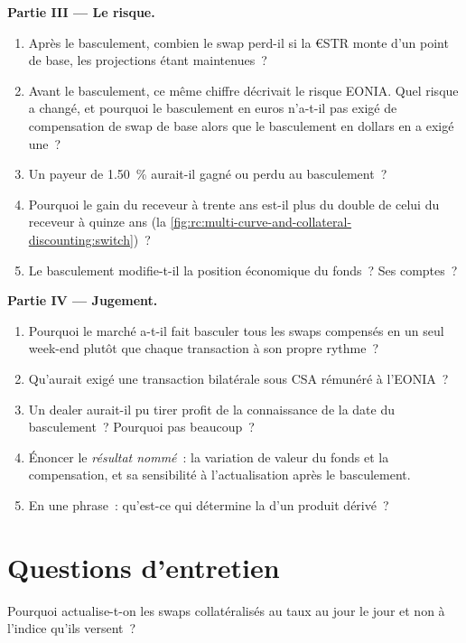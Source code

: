 \begin{problem}
\medskip\noindent\textbf{Partie III --- Le risque.}
\begin{enumerate}[resume]
\item Après le basculement, combien le swap perd-il si la  €STR
monte d'un point de base, les projections étant maintenues~?
\item Avant le basculement, ce même chiffre décrivait le risque EONIA. Quel risque a
changé, et pourquoi le basculement en euros n'a-t-il pas exigé de compensation de swap de base alors que le
basculement en dollars en a exigé une~?
\item Un payeur de 1.50~\% aurait-il gagné ou perdu au basculement~?
\item Pourquoi le gain du receveur à trente ans est-il plus du double de celui du receveur à quinze ans
(la \cref{fig:rc:multi-curve-and-collateral-discounting:switch})~?
\item Le basculement modifie-t-il la position économique du fonds~? Ses comptes~?
\end{enumerate}

\medskip\noindent\textbf{Partie IV --- Jugement.}
\begin{enumerate}[resume]
\item Pourquoi le marché a-t-il fait basculer tous les swaps compensés en un seul week-end plutôt que
chaque transaction à son propre rythme~?
\item Qu'aurait exigé une transaction bilatérale sous CSA rémunéré à l'EONIA~?
\item Un dealer aurait-il pu tirer profit de la connaissance de la date du basculement~? Pourquoi pas beaucoup~?
\item Énoncer le \emph{résultat nommé}~: la variation de valeur du fonds et la compensation,
et sa sensibilité à l'actualisation après le basculement.
\item En une phrase~: qu'est-ce qui détermine la  d'un produit dérivé~?
\end{enumerate}
\end{problem}

\section{Questions d'entretien}

\begin{interviewq}\label{iq:rc:multi-curve-and-collateral-discounting:1}
Pourquoi actualise-t-on les swaps collatéralisés au taux au jour le jour et non
à l'indice qu'ils versent~?
\end{interviewq}

